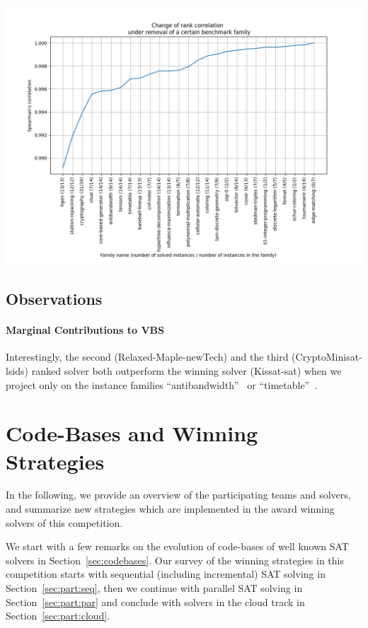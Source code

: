 \documentclass{elsarticle}
\begin{document}
\includegraphics[width=\textwidth]{stability/fam_leave_one_out_corr.png}



\subsection{Observations}

\paragraph{Marginal Contributions to VBS} Interestingly, the second (Relaxed-Maple-newTech) and the third (CryptoMinisat-lsids) ranked solver both outperform the winning solver (Kissat-sat) when we project only on the instance families ``antibandwidth''~\cite{} or ``timetable''~\cite{}. 


\section{Code-Bases and Winning Strategies}
\label{sec:analysis}

In the following, we provide an overview of the participating teams and solvers, 
and summarize new strategies which are implemented in the award winning solvers of this competition. 

We start with a few remarks on the evolution of code-bases of well known SAT solvers in Section~\ref{sec:codebases}. 
Our survey of the winning strategies in this competition starts with sequential (including incremental) SAT solving in Section~\ref{sec:part:seq}, then we continue with parallel SAT solving in Section~\ref{sec:part:par} and conclude with solvers in the cloud track in Section~\ref{sec:part:cloud}. 
\end{document}
